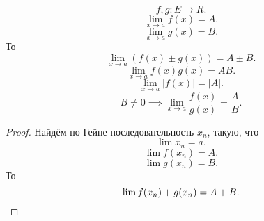 \documentclass[11pt, oneside]{article}   	%
\begin{document}
        \begin{dlemma}
            \[ f, g: E \to R .\] 
            \[ \lim\limits_{x \to a} f(x) = A .\] 
            \[ \lim\limits_{x \to a} g(x) = B .\] 
            То
            \[ \lim\limits_{x \to a} (f(x)\pm g(x)) = A\pm B .\]
            \[ \lim\limits_{x \to a} f(x)g(x) = AB .\] 
            \[ \lim\limits_{x \to a} |f(x)| = |A| .\] 
            \[ B \neq 0 \implies \lim\limits_{x \to a} \frac{f(x)}{g(x)} = \frac{A}{B} .\] 
            \begin{proof}
               Найдём по Гейне последовательность $x_n$, такую, что
               \[ \lim x_n = a .\] 
               \[ \lim f(x_n) = A .\]
               \[ \lim g(x_n) = B .\]
               То
               \[ \lim f(x_n)+g(x_n) = A + B .\qedhere\]

            \end{proof}
        \end{dlemma}
\end{document}
